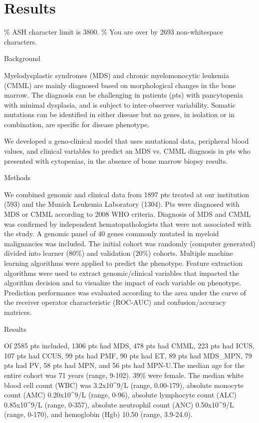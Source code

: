 \section{Results}%
\% ASH character limit is 3800. 
\% You are over by 2693 non-whitespace characters.


Background

Myelodysplastic syndromes (MDS) and chronic myelomonocytic leukemia (CMML) are mainly diagnosed based on morphological changes in the bone marrow. The diagnosis can be challenging in patients (pts) with pancytopenia with minimal dysplasia, and is subject to inter-observer variability. Somatic mutations can be identified in either disease but no genes, in isolation or in combination, are specific for disease phenotype.

We developed a geno-clinical model that uses mutational data, peripheral blood values, and clinical variables to predict an MDS vs. CMML diagnosis in pts who presented with cytopenias, in the absence of bone marrow biopsy results.


Methods

We combined genomic and clinical data from 1897 pts treated at our institution (593) and the Munich Leukemia Laboratory (1304). Pts were diagnosed with MDS or CMML according to 2008 WHO criteria. Diagnosis of MDS and CMML was confirmed by independent hematopathologists that were not associated with the study. A genomic panel of 40 genes commonly mutated in myeloid malignancies was included. The initial cohort was randomly (computer generated) divided into learner (80\%) and validation (20\%) cohorts. Multiple machine learning algorithms were applied to predict the phenotype. Feature extraction algorithms were used to extract genomic/clinical variables that impacted the algorithm decision and to visualize the impact of each variable on phenotype. Prediction performance was evaluated according to the area under the curve of the receiver operator characteristic (ROC-AUC) and confusion/accuracy matrices.


Results

Of 2585 pts included, 1306 pts had MDS, 478 pts had CMML, 223 pts had ICUS, 107 pts had CCUS, 99 pts had PMF, 90 pts had ET, 89 pts had MDS_MPN, 79 pts had PV, 58 pts had MPN, and 56 pts had MPN-U.The median age for the entire cohort was 71 years (range, 9-102). 39\% were female. The median white blood cell count (WBC) was 3.2x10^9/L (range, 0.00-179), absolute monocyte count (AMC) 0.20x10^9/L (range, 0-96), absolute lymphocyte count (ALC) 0.85x10^9/L (range, 0-357), absolute neutrophil count (ANC) 0.50x10^9/L (range, 0-170), and hemoglobin (Hgb)  10.50 (range, 3.9-24.0). 

